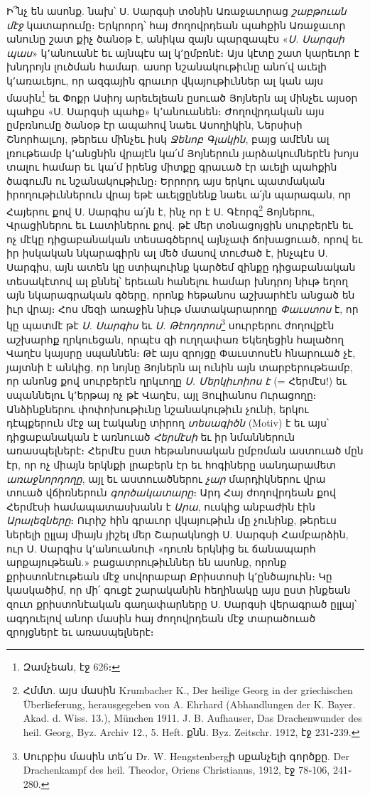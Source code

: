 \documentclass{article}
\begin{document}
{Ի՞նչ են ասոնք. նախ՝ Ս. Սարգսի տօնին Առաջաւորաց \emph{շաբթուան մէջ} կատարումը։ Երկրորդ՝ հայ ժողովրդեան պահքին Առաջաւոր անունը շատ քիչ ծանօթ է, անիկա զայն պարզապէս «\emph{Ս. Սարգսի պաս}» կ՚անուանէ եւ այնպէս ալ կ՚ըմբռնէ։ Այս կէտը շատ կարեւոր է խնդրոյն լուծման համար. ասոր նշանակութիւնը անո՛վ աւելի կ՚առաւեյու, որ ազգային գրաւոր վկայութիւններ ալ կան այս մասին\footnote{Զամչեան, էջ 626։} եւ Փոքր Ասիոյ արեւելեան ըսուած Յոյներն ալ մինչեւ այսօր պահքս «Ս. Սարգսի պահք» կ՚անուանեն։ Ժողովրդական այս ըմբռնումը ծանօթ էր ապահով նաեւ Ասողիկին, Ներսիսի Շնորհալւոյ, թերեւս մինչեւ իսկ \emph{Ջենոբ Գլակին}, բայց ամէնն ալ լռութեամբ կ՚անցնին վրայէն կա՛մ Յոյներուն յարձակումներէն խոյս տալու համար եւ կա՛մ իրենց միտքը գրաւած էր աւելի պահքին ծագումն ու նշանակութիւնը։ Երրորդ այս երկու պատմական իրողութիւններուն վրայ եթէ աւելցընենք նաեւ ա՛յն պարագան, որ Հայերու քով Ս. Սարգիս ա՛յն է, ինչ որ է Ս. Գէորգ\footnote{Հմմտ. այս մասին Krumbacher K., Der heilige Georg in der griechischen Überlieferung, herausgegeben von A. Ehrhard (Abhandlungen der K. Bayer. Akad. d. Wiss. 13.), München 1911. J. B. Aufhauser, Das Drachenwunder des heil. Georg, Byz. Archiv 12., 5. Heft. քնն. Byz. Zeitschr. 1912, էջ 231֊239.} Յոյներու, Վրացիներու եւ Լատիներու քով. թէ մեր տօնացոյցին սուրբերէն եւ ոչ մէկը դիցաբանական տեսագծերով այնչափ ճոխացուած, որով եւ իր իսկական նկարագիրն ալ մեծ մասով տուժած է, ինչպէս Ս. Սարգիս, այն ատեն կը ստիպուինք կարծեմ զինքը դիցաբանական տեսակէտով ալ քննել՝ երեւան հանելու համար խնդրոյ նիւթ եղող այն նկարագրական գծերը, որոնք հեթանոս աշխարհէն անցած են իւր վրայ։ Հոս մեզի առաջին նիւթ մատակարարողը \emph{Փաւստոս} է, որ կը պատմէ թէ \emph{Ս. Սարգիս} եւ \emph{Ս. Թէոդորոս}\footnote{Սուրբիս մասին տե՛ս Dr. W. Hengstenbergի սքանչելի գործքը. Der Drachenkampf des heil. Theodor, Oriens Christianus, 1912, էջ 78֊106, 241֊280.} սուրբերու ժողովքէն աշխարհք ղրկուեցան, որպէս զի ուղղափառ Եկեղեցին հալածող Վաղէս կայսրը սպաննեն։ Թէ այս զրոյցը Փաւստոսէն հնարուած չէ, յայտնի է անկից, որ նոյնը Յոյներն ալ ունին այն տարբերութեամբ, որ անոնց քով սուրբերէն ղրկւողը \emph{Ս. Մերկիւոիոս է} (= Հերմէս!) եւ սպաննելու կ՚երթայ ոչ թէ Վաղէս, այլ Յուլիանոս Ուրացողը։ Անձինքներու փոփոխութիւնը նշանակութիւն չունի, երկու դէպքերուն մէջ ալ էականը տիրող \emph{տեսագիծն} (Motiv) է եւ այս՝ դիցաբանական է առնուած \emph{Հերմէսի} եւ իր նմաններուն առասպելներէ։ Հերմէս ըստ հեթանոսական ըմբռման աստուած մըն էր, որ ոչ միայն երկնքի լրաբերն էր եւ հոգիները սանդարամետ \emph{առաջնորդողը}, այլ եւ աստուածներու \emph{չար} մարդիկներու վրա տուած վճիռներուն \emph{գործակատարը}։ Արդ Հայ ժողովրդեան քով Հերմէսի համապատասխանն է \emph{Արա}, ուսկից անբաժին էին \emph{Արալեզները}։ Ուրիշ հին գրաւոր վկայութիւն մը չունինք, թերեւս ներելի ըլլայ միայն յիշել մեր Շարակնոցի Ս. Սարգսի Համբարձին, ուր Ս. Սարգիս կ՚անուանուի «դուռն երկնից եւ ճանապարհ արքայութեան.» բացատրութիւններ են ասոնք, որոնք քրիստոնէութեան մէջ սովորաբար Քրիստոսի կ՚ընծայուին։ Կը կասկածիմ, որ մի՛ գուցէ շարականին հեղինակը այս ըստ ինքեան զուտ քրիստոնէական գաղափարները Ս. Սարգսի վերագրած ըլլայ՝ ագդուելով անոր մասին հայ ժողովրդեան մէջ տարածուած զրոյցներէ եւ առասպելներէ։

}
\end{document}
